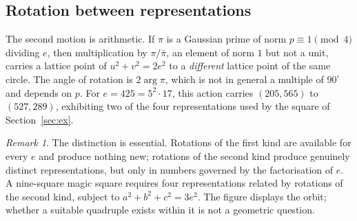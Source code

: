\documentclass[12pt]{article}
\theoremstyle{remark}
\newtheorem{remark}[theorem]{Remark}
\begin{document}
\subsection*{Rotation between representations}

The second motion is arithmetic. If $\pi$ is a Gaussian prime of norm
$p \equiv 1 \pmod 4$ dividing $e$, then multiplication by
$\pi / \bar\pi$, an element of norm $1$ but not a unit, carries a
lattice point of $u^2+v^2 = 2e^2$ to a \emph{different} lattice point
of the same circle. The angle of rotation is $2\arg\pi$, which is not
in general a multiple of $90^\circ$ and depends on $p$. For
$e = 425 = 5^2 \cdot 17$, this action carries $(205,565)$ to
$(527,289)$, exhibiting two of the four representations used by the
square of Section~\ref{sec:ex}.

\begin{remark}
The distinction is essential. Rotations of the first kind are available
for every $e$ and produce nothing new; rotations of the second kind
produce genuinely distinct representations, but only in numbers
governed by the factorisation of $e$. A nine-square magic square
requires four representations related by rotations of the second kind,
subject to $a^2+b^2+c^2 = 3e^2$. The figure displays the orbit; whether
a suitable quadruple exists within it is not a geometric question.
\end{remark}
\begin{center}
\end{center}
\end{document}
